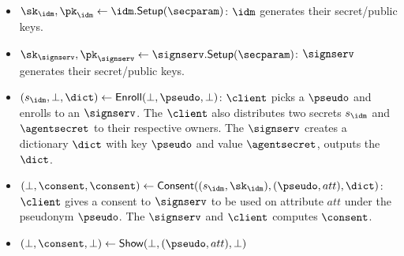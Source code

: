 \begin{itemize}
    \item  $\sk_\idm, \pk_\idm \gets \idm.\mathsf{Setup(\secparam)}$: $\idm$ generates their secret/public keys.
    \item $\sk_\signserv, \pk_\signserv \gets \signserv.\mathsf{Setup}(\secparam)$:  $\signserv$ generates their secret/public keys.

    \item $(s_\idm, \bot, \dict) \gets \mathsf{Enroll}(\bot, \pseudo, \bot)$: $\client$ picks a $\pseudo$ and enrolls to an $\signserv$. The $\client$ also distributes two secrets $s_\idm$ and $\agentsecret$ to their respective owners. The $\signserv$ creates a dictionary $\dict$ with key $\pseudo$ and value $\agentsecret$, outputs the $\dict$.

    \item $(\bot, \consent, \consent) \gets \mathsf{Consent}((s_\idm, \sk_\idm), (\pseudo, att), \dict)$: $\client$ gives a consent to $\signserv$ to be used on attribute $att$ under the pseudonym $\pseudo$. The $\signserv$ and $\client$ computes $\consent$.
    
    \item $(\bot, \consent, \bot) \gets \mathsf{Show}(\bot, (\pseudo, att), \bot )$
\end{itemize}

